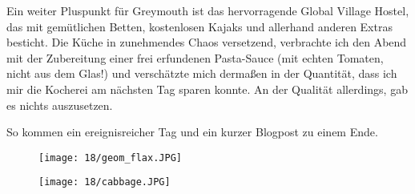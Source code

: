 Ein weiter Pluspunkt für Greymouth ist das hervorragende Global
Village Hostel, das mit gemütlichen Betten, kostenlosen Kajaks und
allerhand anderen Extras besticht. Die Küche in zunehmendes Chaos
versetzend, verbrachte ich den Abend mit der Zubereitung einer frei
erfundenen Pasta-Sauce (mit echten Tomaten, nicht aus dem Glas!) und
verschätzte mich dermaßen in der Quantität, dass ich mir die Kocherei
am nächsten Tag sparen konnte. An der Qualität allerdings, gab es
nichts auszusetzen.

So kommen ein ereignisreicher Tag und ein kurzer Blogpost zu einem
Ende.


\begin{figure}[p]
  \centering
  \texttt{[image: 18/geom\_flax.JPG]}
\end{figure}
\begin{figure}[p]
  \centering
  \texttt{[image: 18/cabbage.JPG]}
\end{figure}
